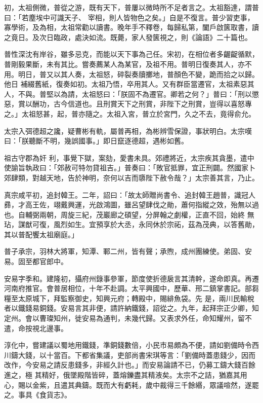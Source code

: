 \begin{pinyinscope}
 初，太祖側微，普從之游，既有天下，普屢以微時所不足者言之。太祖豁達，謂普曰：「若塵埃中可識天子、
 宰相，則人皆物色之矣。」自是不復言。普少習吏事，寡學術，及為相，太祖常勸以讀書。晚年手不釋卷，每歸私第，闔戶啟篋取書，讀之竟日。及次日臨政，處決如流。既薨，家人發篋視之，則《論語》二十篇也。



 普性深沈有岸谷，雖多忌克，而能以天下事為己任。宋初，在相位者多齷齪循默，普剛毅果斷，未有其比。嘗奏薦某人為某官，及祖不用。普明日復奏其人，亦不用。明日，普又以其人奏，太祖怒，碎裂奏牘擲地，普顏色不變，跪而拾之以歸。他日
 補綴舊紙，復奏如初。太祖乃悟，卒用其人。又有群臣當遷官，太祖素惡其人，不與。普堅以為請，太祖怒曰：「朕固不為遷官。卿若之何？」普曰：「刑以懲惡，賞以酬功，古今信道也。且刑賞天下之刑賞，非陛下之刑賞，豈得以喜怒專之。」太祖怒甚，起，普亦隨之。太祖入宮，普立於宮門，久之不去，竟得俞允。



 太宗入弭德超之讒，疑曹彬有軌，屬普再相，為彬辨雪保證，事狀明白。太宗嘆曰：「朕聽斷不明，幾誤國事。」即日竄逐德超，遇彬如舊。



 祖古守郡為奸
 利，事覺下獄，案劾，愛書未具。郊禮將近，太宗疾其貪墨，遣中使諭旨執政曰：「郊赦可特勿貸祖吉。」普奏曰：「敗官抵罪，宜正刑闢。然國家卜郊肆類，對越天地，告於神明，奈何以吉而隳陛下赦令哉？」太宗善其言，乃止。



 真宗咸平初，追封韓王。二年，詔曰：「故太師贈尚書令、追封韓王趙普，識冠人彞，才高王佐，翊戴興運，光啟鴻圖，雖呂望肆伐之勛，蕭何指縱之效，殆無以過也。自輔弼兩朝，周旋三紀，茂巖廊之碩望，分屏翰之劇權，正直不回，始終
 無玷，謀猷可復，風烈如生。宜預享於大丞，永同休於宗祏，茲為茂典，以答舊勛，其以普配饗太祖廟庭。」



 普子承宗，羽林大將軍，知潭、鄆二州，皆有聲；承煦，成州團練使。弟固、安易。固至都官郎中。



 安易字季和。建隆初，攝府州錄事參軍，節度使折德扆言其清幹，遂命即真。再遷河南府推官。會普居相位，十年不赴調。太平興國中，歷華、邢二鎮掌書記。部芻糧至太原城下，拜監察御史，知興元府；轉殿中，賜緋魚袋。先
 是，兩川民輸稅者以鐵錢易銅錢。安易言其非便，請許納鐵錢，詔從之。九年，起拜宗正少卿，知定州。會以曹璨知州，徙安易為通判，未幾代歸。又表求外任，命知耀州，留不遣，命按視北邊事。



 淳化中，嘗建議以蜀地用鐵錢，準銅錢數倍，小民市易頗為不便，請如劉備時令西川鑄大錢，以十當百。下都省集議，吏部尚書宋琪等言：「劉備時蓋患錢少，因而改作，今安易之請反患錢多，非經久計也。」而安易論請不已，仍募工鑄大錢百餘進之，極
 其精好，俄墜殿階皆碎，蓋熔鑠盡其精液矣。太宗不之詰，猶嘉其用心，賜以金紫，且遣其典鑄。既而大有虧耗，歲中裁得三千餘緡，眾議喧然，遂罷之。事具《食貨志》。




\end{pinyinscope}
